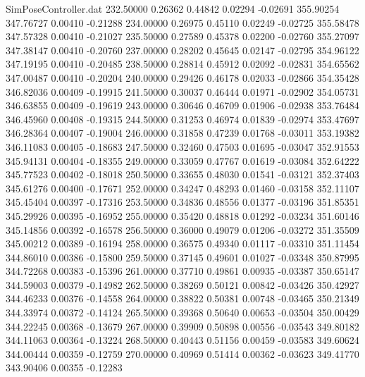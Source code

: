 \begin{filecontents}{SimPoseController.dat}
 232.50000    0.26362    0.44842     0.02294   -0.02691  355.90254  347.76727    0.00410   -0.21288
 234.00000    0.26975    0.45110     0.02249   -0.02725  355.58478  347.57328    0.00410   -0.21027
 235.50000    0.27589    0.45378     0.02200   -0.02760  355.27097  347.38147    0.00410   -0.20760
 237.00000    0.28202    0.45645     0.02147   -0.02795  354.96122  347.19195    0.00410   -0.20485
 238.50000    0.28814    0.45912     0.02092   -0.02831  354.65562  347.00487    0.00410   -0.20204
 240.00000    0.29426    0.46178     0.02033   -0.02866  354.35428  346.82036    0.00409   -0.19915
 241.50000    0.30037    0.46444     0.01971   -0.02902  354.05731  346.63855    0.00409   -0.19619
 243.00000    0.30646    0.46709     0.01906   -0.02938  353.76484  346.45960    0.00408   -0.19315
 244.50000    0.31253    0.46974     0.01839   -0.02974  353.47697  346.28364    0.00407   -0.19004
 246.00000    0.31858    0.47239     0.01768   -0.03011  353.19382  346.11083    0.00405   -0.18683
 247.50000    0.32460    0.47503     0.01695   -0.03047  352.91553  345.94131    0.00404   -0.18355
 249.00000    0.33059    0.47767     0.01619   -0.03084  352.64222  345.77523    0.00402   -0.18018
 250.50000    0.33655    0.48030     0.01541   -0.03121  352.37403  345.61276    0.00400   -0.17671
 252.00000    0.34247    0.48293     0.01460   -0.03158  352.11107  345.45404    0.00397   -0.17316
 253.50000    0.34836    0.48556     0.01377   -0.03196  351.85351  345.29926    0.00395   -0.16952
 255.00000    0.35420    0.48818     0.01292   -0.03234  351.60146  345.14856    0.00392   -0.16578
 256.50000    0.36000    0.49079     0.01206   -0.03272  351.35509  345.00212    0.00389   -0.16194
 258.00000    0.36575    0.49340     0.01117   -0.03310  351.11454  344.86010    0.00386   -0.15800
 259.50000    0.37145    0.49601     0.01027   -0.03348  350.87995  344.72268    0.00383   -0.15396
 261.00000    0.37710    0.49861     0.00935   -0.03387  350.65147  344.59003    0.00379   -0.14982
 262.50000    0.38269    0.50121     0.00842   -0.03426  350.42927  344.46233    0.00376   -0.14558
 264.00000    0.38822    0.50381     0.00748   -0.03465  350.21349  344.33974    0.00372   -0.14124
 265.50000    0.39368    0.50640     0.00653   -0.03504  350.00429  344.22245    0.00368   -0.13679
 267.00000    0.39909    0.50898     0.00556   -0.03543  349.80182  344.11063    0.00364   -0.13224
 268.50000    0.40443    0.51156     0.00459   -0.03583  349.60624  344.00444    0.00359   -0.12759
 270.00000    0.40969    0.51414     0.00362   -0.03623  349.41770  343.90406    0.00355   -0.12283

\end{filecontents}

